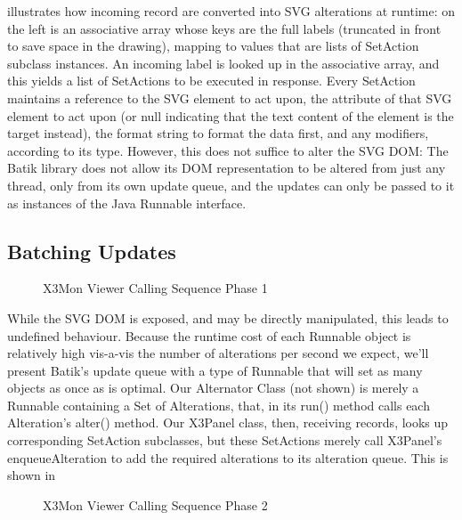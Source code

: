  illustrates how incoming record are converted
into SVG alterations at runtime: on the left is an associative array whose
keys are the full \rawproto{} labels (truncated in front to save space
in the drawing), mapping to values that are lists of SetAction subclass
instances. An incoming label is looked up in the associative array,
and this yields a list of SetActions to be executed in response. Every
SetAction maintains a reference to the SVG element to act upon, the
attribute of that SVG element to act upon (or null indicating that the
text content of the element is the target instead), the format string to
format the data first, and any modifiers, according to its type. However,
this does not suffice to alter the SVG DOM: The Batik library does not
allow its DOM representation to be altered from just any thread, only
from its own update queue, and the updates can only be passed to it as
instances of the Java Runnable interface.

\subsection*{Batching Updates}

\begin{figure}[htbp]
	\centering
	\caption{X3Mon Viewer Calling Sequence Phase 1}
	\label{fig:viewersequence1}
\end{figure}

While the SVG DOM is exposed, and may be directly manipulated, this
leads to undefined behaviour. Because the runtime cost of each Runnable
object is relatively high vis-a-vis the number of alterations per second
we expect, we'll present Batik's update queue with a type of Runnable
that will set as many objects as once as is optimal. Our Alternator
Class (not shown) is merely a Runnable containing a Set of Alterations,
that, in its run() method calls each Alteration's alter() method. Our
X3Panel class, then, receiving records, looks up corresponding SetAction
subclasses, but these SetActions merely call X3Panel's enqueueAlteration
to add the required alterations to its alteration queue. This is shown
in 

\begin{figure}[htbp]
	\centering
	\caption{X3Mon Viewer Calling Sequence Phase 2} \label{fig:viewersequence2}
\end{figure}

